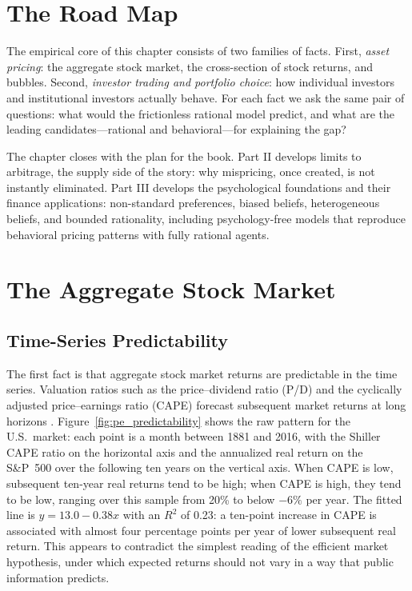 \section{The Road Map}
\label{sec:roadmap}

The empirical core of this chapter consists of two families of facts. First, \emph{asset pricing}: the aggregate stock market, the cross-section of stock returns, and bubbles. Second, \emph{investor trading and portfolio choice}: how individual investors and institutional investors actually behave. For each fact we ask the same pair of questions: what would the frictionless rational model predict, and what are the leading candidates---rational and behavioral---for explaining the gap?

The chapter closes with the plan for the book. Part II develops limits to arbitrage, the supply side of the story: why mispricing, once created, is not instantly eliminated. Part III develops the psychological foundations and their finance applications: non-standard preferences, biased beliefs, heterogeneous beliefs, and bounded rationality, including psychology-free models that reproduce behavioral pricing patterns with fully rational agents.

\section{The Aggregate Stock Market}
\label{sec:aggregate}

\subsection{Time-Series Predictability}
\label{sec:predictability}

The first fact is that aggregate stock market returns are predictable in the time series. Valuation ratios such as the price--dividend ratio (P/D) and the cyclically adjusted price--earnings ratio (CAPE) forecast subsequent market returns at long horizons \citep{campbell1988,fama1988}. Figure~\ref{fig:pe_predictability} shows the raw pattern for the U.S.\ market: each point is a month between 1881 and 2016, with the Shiller CAPE ratio on the horizontal axis and the annualized real return on the S\&P~500 over the following ten years on the vertical axis. When CAPE is low, subsequent ten-year real returns tend to be high; when CAPE is high, they tend to be low, ranging over this sample from 20\% to below $-6\%$ per year. The fitted line is $y = 13.0 - 0.38x$ with an $R^2$ of 0.23: a ten-point increase in CAPE is associated with almost four percentage points per year of lower subsequent real return. This appears to contradict the simplest reading of the efficient market hypothesis, under which expected returns should not vary in a way that public information predicts.

